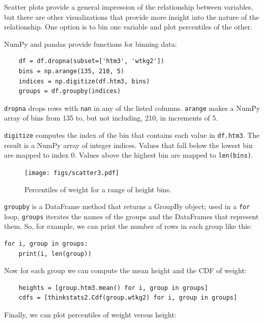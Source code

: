 \documentclass[12pt]{book}
\theoremstyle{exercise}
\begin{document}
Scatter plots provide a general impression of the relationship between
variables, but there are other visualizations that provide more
insight into the nature of the relationship.  One option is to bin one
variable and plot percentiles of the other.%

NumPy and pandas provide functions for binning data:%
%

\begin{verbatim}
    df = df.dropna(subset=['htm3', 'wtkg2'])
    bins = np.arange(135, 210, 5)
    indices = np.digitize(df.htm3, bins)
    groups = df.groupby(indices)
\end{verbatim}

{\tt dropna} drops rows with {\tt nan} in any of the listed columns.
{\tt arange} makes a NumPy array of bins from 135 to, but not including,
210, in increments of 5.%
%
%

{\tt digitize} computes the index of the bin that contains each value
in {\tt df.htm3}.  The result is a NumPy array of integer indices.
Values that fall below the lowest bin are mapped to index 0.  Values
above the highest bin are mapped to {\tt len(bins)}.

\begin{figure}
\centerline{\texttt{[image: figs/scatter3.pdf]}}
\caption{Percentiles of weight for a range of height bins.}%
\label{scatter3}
\end{figure}

{\tt groupby} is a DataFrame method that returns a GroupBy object;
used in a {\tt for} loop, {\tt groups} iterates the names of the groups
and the DataFrames that represent them.  So, for example, we can
print the number of rows in each group like this:%
%

\begin{verbatim}
for i, group in groups:
    print(i, len(group))
\end{verbatim}

Now for each group we can compute the mean height and the CDF
of weight:%

\begin{verbatim}
    heights = [group.htm3.mean() for i, group in groups]
    cdfs = [thinkstats2.Cdf(group.wtkg2) for i, group in groups]
\end{verbatim}

Finally, we can
plot percentiles of weight versus height:%
\end{document}
